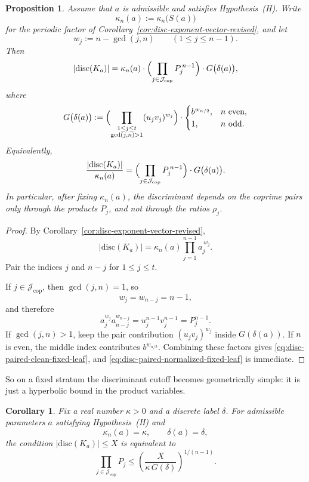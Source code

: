 \documentclass[11pt,letterpaper]{amsart}
\newcommand{\disc}{\mathrm{disc}}
\theoremstyle{plain}
\newtheorem{proposition}[theorem]{Proposition}
\newtheorem{corollary}[theorem]{Corollary}
\theoremstyle{definition}
\begin{document}
\begin{proposition}
\label{prop:disc-pairs-only-products-fixed-leaf}
Assume that \(a\) is admissible and satisfies Hypothesis~\textup{(H)}.
Write
\[
\kappa_n(a):=\kappa_n\bigl(S(a)\bigr)
\]
for the periodic factor of Corollary~\ref{cor:disc-exponent-vector-revised}, and
let
\[
w_j:=n-\gcd(j,n)
\qquad (1\le j\le n-1).
\]
Then
\begin{equation}\label{eq:disc-paired-clean-fixed-leaf}
|\disc(K_a)|
=
\kappa_n(a)
\cdot
\Bigl(\prod_{j\in \mathcal J_{\mathrm{cop}}}P_j^{\,n-1}\Bigr)
\cdot
G\bigl(\delta(a)\bigr),
\end{equation}
where
\[
G\bigl(\delta(a)\bigr)
:=
\Bigl(
\prod_{\substack{1\le j\le t\\ \gcd(j,n)>1}}
(u_jv_j)^{w_j}
\Bigr)
\cdot
\begin{cases}
b^{w_{n/2}},& n\text{ even},\\
1,& n\text{ odd}.
\end{cases}
\]
Equivalently,
\begin{equation}\label{eq:disc-paired-normalized-fixed-leaf}
\frac{|\disc(K_a)|}{\kappa_n(a)}
=
\Bigl(\prod_{j\in \mathcal J_{\mathrm{cop}}}P_j^{\,n-1}\Bigr)
\cdot
G\bigl(\delta(a)\bigr).
\end{equation}
In particular, after fixing \(\kappa_n(a)\), the discriminant depends on the
coprime pairs only through the products \(P_j\), and not through the ratios
\(\rho_j\).
\end{proposition}

\begin{proof}
By Corollary~\ref{cor:disc-exponent-vector-revised},
\[
|\disc(K_a)|=\kappa_n(a)\prod_{j=1}^{n-1} a_j^{\,w_j}.
\]
Pair the indices \(j\) and \(n-j\) for \(1\le j\le t\).

If \(j\in \mathcal J_{\mathrm{cop}}\), then \(\gcd(j,n)=1\), so
\[
w_j=w_{n-j}=n-1,
\]
and therefore
\[
a_j^{w_j}a_{n-j}^{w_{n-j}}
=
u_j^{n-1}v_j^{n-1}
=
P_j^{n-1}.
\]
If \(\gcd(j,n)>1\), keep the pair contribution \((u_jv_j)^{w_j}\) inside
\(G(\delta(a))\).  If \(n\) is even, the middle index contributes
\(b^{w_{n/2}}\).  Combining these factors gives
\eqref{eq:disc-paired-clean-fixed-leaf}, and
\eqref{eq:disc-paired-normalized-fixed-leaf} is immediate.
\end{proof}

So on a fixed stratum the discriminant cutoff becomes geometrically simple: it is just a hyperbolic bound in the product variables.

\begin{corollary}
\label{cor:disc-product-constraint-fixed-leaf}
Fix a real number \(\kappa>0\) and a discrete label \(\delta\).
For admissible parameters \(a\) satisfying Hypothesis~\textup{(H)} and
\[
\kappa_n(a)=\kappa,
\qquad
\delta(a)=\delta,
\]
the condition \(|\disc(K_a)|\le X\) is equivalent to
\[
\prod_{j\in \mathcal J_{\mathrm{cop}}}P_j
\le
\left(\frac{X}{\kappa\,G(\delta)}\right)^{1/(n-1)}.
\]
\end{corollary}
\end{document}
